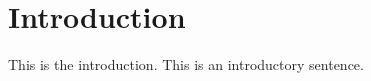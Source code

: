 \hypertarget{index_intro_sec}{}\section{Introduction}\label{index_intro_sec}
This is the introduction. This is an introductory sentence. 